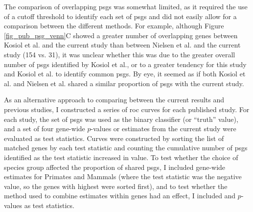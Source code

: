 
The comparison of overlapping \acp{psg} was somewhat limited, as it
required the use of a cutoff threshold to identify each set of
\acp{psg} and did not easily allow for a comparison between the
different methods. For example, although Figure
\ref{fig_pub_psg_venn}C showed a greater number of overlapping genes
between Kosiol et al. and the current study than between Nielsen et
al. and the current study (154 vs. 31), it was unclear whether this
was due to the greater overall number of \acp{psg} identified by
Kosiol et al., or to a greater tendency for this study and Kosiol et
al. to identify common \acp{psg}. By eye, it seemed as if both Kosiol
et al. and Nielsen et al. shared a similar proportion of \acp{psg}
with the current study.

As an alternative approach to comparing between the current results
and previous studies, I constructed a series of \ac{roc} curves for
each published study. For each study, the set of \acp{psg} was used as
the binary classifier (or ``truth'' value), and a set of four gene-wide
$p$-values or \dnds estimates from the current study were evaluated as
test statistics. Curves were constructed by sorting the list of
matched genes by each test statistic and counting the cumulative
number of \acp{psg} identified as the test statistic increased in
value. To test whether the choice of species group affected the
proportion of shared \acp{psg}, I included gene-wide \dnds estimates
for Primates and Mammals (where the test statistic was the negative
\dnds value, so the genes with highest \dnds were sorted first), and
to test whether the method used to combine \sw estimates within genes
had an effect, I included \psgeone and \psghoch $p$-values as test
statistics.

